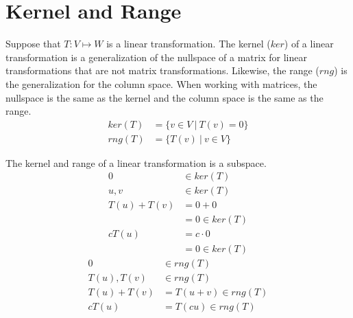 \documentclass{article}
\theoremstyle{mytheoremstyle}
\theoremstyle{mytheoremstyle}
\theoremstyle{myproblemstyle}
\begin{document}
    \section*{Kernel and Range}
    Suppose that $T: V \mapsto W$ is a linear transformation. The kernel ($ker$)
    of a linear transformation is a generalization of the nullspace of a matrix for
    linear transformations that are not matrix transformations. Likewise, the
    range ($rng$) is the generalization for the column space. When working with
    matrices, the nullspace is the same as the kernel and the column space is
    the same as the range.
    \begin{align*}
        ker(T) &= \{ v\in V\ |\ T(v) = 0 \} \\
        rng(T) &= \{T(v)\ |\ v \in V \}
    \end{align*}

    The kernel and range of a linear transformation is a subspace.
    \begin{align*}
        0           &\in ker(T) \\
        u,v         &\in ker(T) \\
        T(u) + T(v) &= 0 + 0 \\
                    &= 0 \in ker(T) \\
        cT(u)       &= c\cdot 0 \\
                    &= 0 \in ker(T)
    \end{align*}
    \begin{align*}
        0           &\in rng(T) \\
        T(u),T(v)   &\in rng(T) \\
        T(u) + T(v) &= T(u+v) \in rng(T) \\
        cT(u) &= T(cu) \in rng(T)
    \end{align*}
\end{document}
